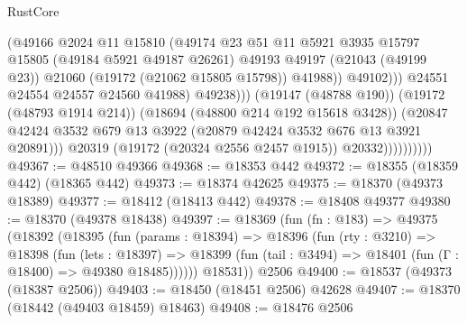 \begin{lexlean}{RustCore}
\begin{coremodule}
                                        (@49166
                                          @2024
                                          @11
                                          @15810
                                          (@49174
                                            @23
                                            @51
                                            @11
                                            @5921
                                            @3935
                                            @15797
                                            @15805
                                            (@49184 @5921 @49187 @26261)
                                            @49193
                                            @49197
                                            (@21043 (@49199 @23))
                                            @21060
                                            (@19172 (@21062 @15805 @15798))
                                            @41988))
                                        @49102)))
                                  @24551
                                  @24554
                                  @24557
                                  @24560
                                  @41988)
                                @49238)))
                          (@19147 (@48788 @190))
                          (@19172 (@48793 @1914 @214))
                          (@18694 (@48800 @214 @192 @15618 @3428))
                          (@20847
                            @42424
                            @3532
                            @679
                            @13
                            @3922
                            (@20879 @42424 @3532 @676 @13 @3921 @20891)))
                        @20319
                        (@19172 (@20324 @2556 @2457 @1915))
                        @20332))))))))))
@49367 := @48510 @49366
@49368 := @18353 @442
@49372 := @18355 (@18359 @442) (@18365 @442)
@49373 := @18374 @42625
@49375 := @18370 (@49373 @18389)
@49377 := @18412 (@18413 @442)
@49378 := @18408 @49377
@49380 := @18370 (@49378 @18438)
@49397 := @18369
    (fun (fn : @183) =>
    @49375
      (@18392
        (@18395
          (fun (params : @18394) =>
          @18396
            (fun (rty : @3210) =>
            @18398
              (fun (lets : @18397) =>
              @18399 (fun (tail : @3494) => @18401 (fun (Γ : @18400) => @49380 @18485))))))
        @18531))
    @2506
@49400 := @18537 (@49373 (@18387 @2506))
@49403 := @18450 (@18451 @2506) @42628
@49407 := @18370 (@18442 (@49403 @18459) @18463)
@49408 := @18476 @2506

\end{coremodule}
\end{lexlean}
